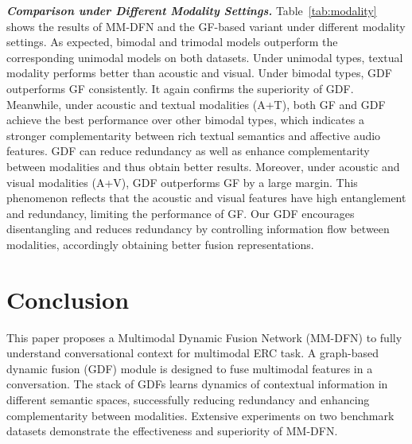  \textit{\textbf{Comparison under Different Modality Settings.}}
Table~\ref{tab:modality} shows the results of MM-DFN and the GF-based variant under different modality settings.
As expected, bimodal and trimodal models outperform the corresponding unimodal models on both datasets. %
Under unimodal types, textual modality performs better than acoustic and visual. 
Under bimodal types, GDF outperforms GF consistently.
It again confirms the superiority of GDF. %
Meanwhile, under acoustic and textual modalities (A+T), both GF and GDF achieve the best performance over other bimodal types, which indicates a stronger complementarity between rich textual semantics and affective audio features. %
GDF can reduce redundancy as well as enhance complementarity between modalities and thus obtain better results. 
Moreover, under acoustic and visual modalities (A+V), GDF outperforms GF by a large margin.
This phenomenon reflects that the acoustic and visual features have high entanglement and redundancy, limiting the performance of GF.
Our GDF encourages disentangling and reduces redundancy by controlling information flow between modalities, accordingly obtaining better fusion representations.

\section{Conclusion}

This paper proposes a Multimodal Dynamic Fusion Network (MM-DFN) to fully understand conversational context for multimodal ERC task. 
A graph-based dynamic fusion (GDF) module is designed to fuse multimodal features in a conversation. The stack of GDFs learns dynamics of contextual information in different semantic spaces, successfully reducing redundancy and enhancing complementarity between modalities. 
Extensive experiments on two benchmark datasets demonstrate the effectiveness and superiority of MM-DFN. 

